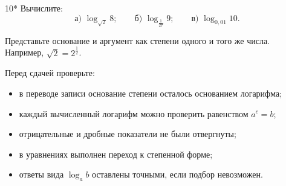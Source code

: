 \begin{homeworktask}{10*}
  Вычислите:
  \[
    \text{а) }\log_{\sqrt2}8;
    \qquad
    \text{б) }\log_{\frac1{27}}9;
    \qquad
    \text{в) }\log_{0{,}01}10.
  \]

  \begin{hintbox}
    Представьте основание и аргумент как степени одного и того же числа.
    Например, \(\sqrt2=2^{\frac12}\).
  \end{hintbox}
\end{homeworktask}
\answerspace{45mm}

\begin{selfcheck}
  Перед сдачей проверьте:
  \begin{itemize}[itemsep=0.18em,topsep=0.25em]
    \item в переводе записи основание степени осталось основанием логарифма;
    \item каждый вычисленный логарифм можно проверить равенством \(a^c=b\);
    \item отрицательные и дробные показатели не были отвергнуты;
    \item в уравнениях выполнен переход к степенной форме;
    \item ответы вида \(\log_a b\) оставлены точными, если подбор невозможен.
  \end{itemize}
\end{selfcheck}
